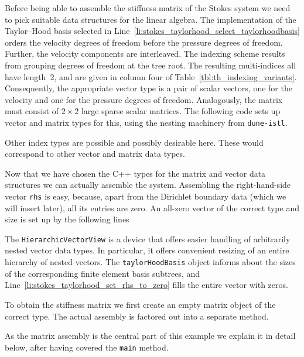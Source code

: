 \documentclass[a4paper,10pt,headings=normal,bibliography=totoc]{scrartcl}
\newcommand{\cpp}[1]{\lstinline[basicstyle=\ttfamily]!#1!}
\newcommand{\dunemodule}[1]{\texttt{#1}}
\begin{document}
Before being able to assemble the stiffness matrix of the Stokes system we need to pick suitable data structures
for the linear algebra.
The implementation of the Taylor--Hood basis selected in Line~\ref{li:stokes_taylorhood_select_taylorhoodbasis} orders the
velocity degrees of freedom before the pressure degrees of freedom.  Further, the velocity
components are interleaved.  The indexing scheme results from grouping degrees of freedom at the
tree root.  The resulting multi-indices all have length~2, and are given in column four of Table~\ref{tbl:th_indexing_variants}.
Consequently, the appropriate vector type is a pair of scalar vectors, one for the velocity and one for the pressure
degrees of freedom.  Analogously, the matrix must consist of $2 \times 2$ large sparse scalar matrices.
The following code sets up vector and matrix types for this, using the nesting machinery from \dunemodule{dune-istl}.
%

%
Other index types are possible and possibly desirable here.  These would correspond to other vector and
matrix data types.

Now that we have chosen the C++ types for the matrix and vector data structures we can actually assemble the system.
Assembling the right-hand-side vector \cpp{rhs} is easy, because, apart from the Dirichlet boundary data (which we
will insert later), all its entries are zero.  An all-zero vector of the correct type and size is set up by the
following lines
%

%
The \cpp{HierarchicVectorView} is a device that offers easier handling of arbitrarily nested vector data types.
In particular, it offers convenient resizing of an entire hierarchy of nested vectors.
The \cpp{taylorHoodBasis} object informs about the sizes of the corresponding finite element basis subtrees,
and Line~\ref{li:stokes_taylorhood_set_rhs_to_zero} fills the entire vector with zeros.

To obtain the stiffness matrix we first create an empty matrix object of the correct type.  The actual assembly
is factored out into a separate method.
%

%
As the matrix assembly is the central part of this example we explain it in detail below, after having covered the \cpp{main} method.
\end{document}
